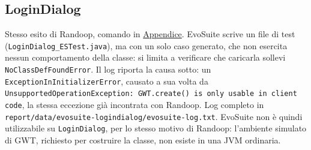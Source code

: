 \subsection{LoginDialog}

Stesso esito di Randoop, comando
in \hyperref[cmd:evosuite-logindialog]{Appendice}. EvoSuite scrive un file di
test (\texttt{LoginDialog\_ESTest.java}), ma con un solo caso generato, che non esercita nessun
comportamento della classe: si limita a verificare che caricarla sollevi
\texttt{NoClassDefFoundError}. Il log riporta la causa sotto: un
\texttt{ExceptionInInitializerError}, causato a sua volta da \texttt{UnsupportedOperationException:
GWT.create() is only usable in client code}, la stessa eccezione già incontrata con Randoop. Log completo in
\texttt{report/data/evosuite-logindialog/evosuite-log.txt}. EvoSuite non è quindi utilizzabile
su \texttt{LoginDialog}, per lo stesso motivo di Randoop: l'ambiente simulato di GWT, richiesto
per costruire la classe, non esiste in una JVM ordinaria.
